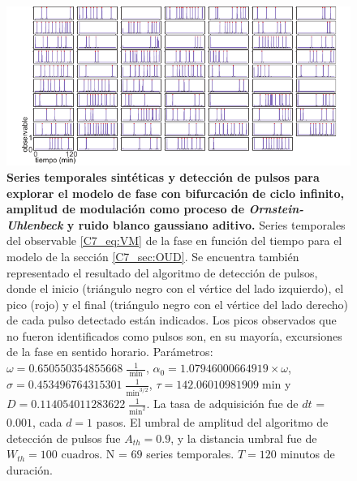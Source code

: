 \documentclass[./main.tex]{subfiles}
\begin{document}
\begin{subappendices}
 
\begin{figure}
    \centering
    \includegraphics[width=1\columnwidth]{figures/chapter7/C7_OUD_traces_for_evaluation_VM.pdf} 
    \caption{\textbf{Series temporales sintéticas y detección de pulsos para explorar el modelo de fase con bifurcación de ciclo infinito, amplitud de modulación como proceso de \textit{Ornstein-Uhlenbeck} y ruido blanco gaussiano aditivo.} Series temporales del observable \ref{C7_eq:VM} de la fase en función del tiempo para el modelo de la sección \ref{C7_sec:OUD}. Se encuentra también representado el resultado del algoritmo de detección de pulsos, donde el inicio (triángulo negro con el vértice del lado izquierdo), el pico (rojo) y el final (triángulo negro con el vértice del lado derecho) de cada pulso detectado están indicados. Los picos observados que no fueron identificados como pulsos son, en su mayoría, excursiones de la fase en sentido horario. Parámetros: $\omega = 0.650550354855668 \; \frac{1}{\text{ min }}$, $\alpha_0 = 1.07946000664919 \times \omega$, $ \sigma = 0.453496764315301 \; \frac{1}{\text{min}^{3/2}}$, $\tau = 142.06010981909 \; \text{min} $ y $D = 0.114054011283622 \; \frac{1}{\text{min}^{2}}$. La tasa de adquisición fue de $dt$ = $0.001$, cada $d = 1$ pasos. El umbral de amplitud del algoritmo de detección de pulsos fue $A_{th} = 0.9$, y la distancia umbral fue de $W_{th} = 100\text{ cuadros}$. N = $69$ series temporales. $T = 120$ minutos de duración.}
    \label{C7_fig:OUD_traces_VM}
\end{figure}


\end{subappendices}
\end{document}
